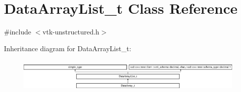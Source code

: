 \hypertarget{classDataArrayList__t}{}\section{Data\+Array\+List\+\_\+t Class Reference}
\label{classDataArrayList__t}


{\ttfamily \#include $<$vtk-\/unstructured.\+h$>$}

Inheritance diagram for Data\+Array\+List\+\_\+t\+:\begin{figure}[H]
\begin{center}
\leavevmode
\includegraphics[height=1.660079cm]{classDataArrayList__t}
\end{center}
\end{figure}
